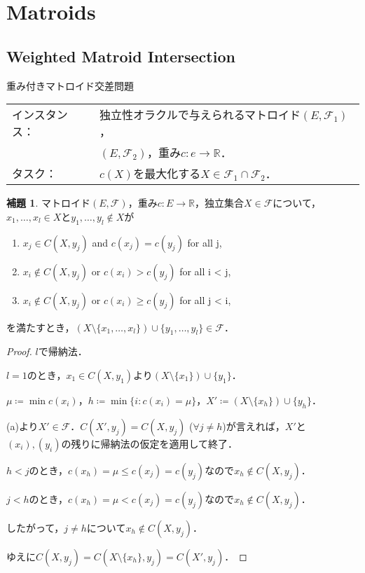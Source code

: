 \documentclass[xelatex,ja=standard,a4paper,14pt,everyparhook=compat]{bxjsarticle}
\newcommand{\bbR}{\mathbb{R}}
\newcommand{\mcF}{\mathcal{F}}
\theoremstyle{definition}
\newtheorem{lemma}{補題}
\begin{document}
\setcounter{section}{12}
\section{Matroids}
\setcounter{subsection}{6}
\subsection{Weighted Matroid Intersection}

\begin{itembox}[l]{重み付きマトロイド交差問題}
    \begin{tabular}{ll}
        インスタンス： & 独立性オラクルで与えられるマトロイド$(E,\mcF_1)$， \\
                       & $(E,\mcF_2)$，重み$c:e\to\bbR$．                   \\
        タスク：       & $c(X)$を最大化する$X \in \mcF_1 \cap \mcF_2$．
    \end{tabular}
\end{itembox}

\setcounter{theorem}{34}
\begin{lemma}
    マトロイド$(E,\mcF)$，重み$c:E\to\bbR$，独立集合$X \in \mcF$について，$x_1,\ldots,x_l \in X$と$y_1,\ldots,y_l \notin X$が \begin{enumerate}
        \item $x_j \in C(X, y_j)$ and $c(x_j) = c(y_j)$ for all j,
        \item $x_i \notin C(X, y_j)$ or $c(x_i) > c(y_j)$ for all i < j,
        \item $x_i \notin C(X, y_j)$ or $c(x_i) \geq c(y_j)$ for all j < i,
    \end{enumerate}
    を満たすとき，$(X \setminus \{x_1,\ldots,x_l\}) \cup \{y_1,\ldots,y_l\} \in \mcF$．
\end{lemma}
\begin{proof}
    $l$で帰納法．

    $l=1$のとき，$x_1 \in C(X,y_1)$より$(X \setminus \{x_1\}) \cup \{y_1\}$．

    $\mu \coloneqq \min c(x_i)$，$h \coloneqq \min \{i : c(x_i) = \mu\}$，$X' \coloneqq (X \setminus \{x_h\}) \cup \{y_h\}$．

    (a)より$X' \in \mcF$．$C(X',y_j) = C(X,y_j)$ ($\forall j \neq h$)が言えれば，$X'$と$(x_i), (y_i)$の残りに帰納法の仮定を適用して終了．

    $h < j$のとき，$c(x_h) = \mu \leq c(x_j) = c(y_j)$なので$x_h \notin C(X,y_j)$．

    $j < h$のとき，$c(x_h) = \mu < c(x_j) = c(y_j)$なので$x_h \notin C(X,y_j)$．

    したがって，$j \neq h$について$x_h \notin C(X,y_j)$．

    ゆえに$C(X,y_j) = C(X \setminus \{x_h\}, y_j) = C(X', y_j)$．
\end{proof}
\end{document}
